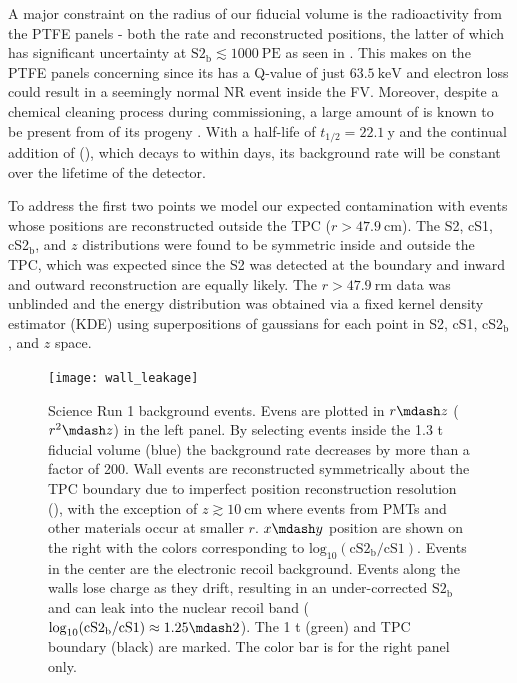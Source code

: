 A major constraint on the radius of our fiducial volume is the radioactivity from the PTFE panels - both the rate and reconstructed
positions, the latter of which has significant uncertainty at $\mathrm{S2_b} \lesssim 1000\ \mathrm{PE}$ as seen in
.  This makes  on the PTFE panels concerning since its \betadecay has
a Q-value of just $63.5\ \mathrm{keV}$ and electron loss could result in a seemingly normal NR event inside the FV.  Moreover, despite a
chemical cleaning process during commissioning, a large amount of  is known to be present from \alphadecays of its progeny
.  With a half-life of $t_{1/2} = 22.1\ \mathrm{y}$ and the continual addition of 
(), which decays to  within days, its background rate will be
constant over the lifetime of the detector.

To address the first two points we model our expected contamination with events whose positions are reconstructed outside the
TPC ($r > 47.9\ \mathrm{cm}$).  The S2, cS1, cS2$_{\mathrm{b}}$, and $z$
distributions were found to be symmetric inside and outside the TPC, which was expected since the S2 was detected at the boundary and
inward and outward reconstruction are equally likely.  The
$r > 47.9\ \mathrm{rm}$ data was unblinded and the energy distribution was obtained via a fixed kernel density estimator (KDE) using
superpositions of gaussians for each point in S2, cS1, cS2$_{\mathrm{b}}$, and $z$ space.

\begin{figure}
\centering
\texttt{[image: wall\_leakage]}
\caption{Science Run 1 background events.  Evens are plotted in $r \mdash z$ ($r^2 \mdash z$) in the left panel.  By selecting events
inside the 1.3
t fiducial volume (blue) the background rate decreases by more than a factor of 200.  Wall events are reconstructed symmetrically
about the TPC boundary due to imperfect position reconstruction resolution (), with the
exception of $z \gtrsim 10\ \mathrm{cm}$ where events from PMTs and other materials occur at smaller $r$.  $x \mdash y$ position are shown
on the right with the colors corresponding to $\mathrm{log}_{10}(\mathrm{cS2_b / cS1})$.  Events in the center are the electronic recoil
background.  Events along the walls lose charge as they drift,
resulting in an under-corrected $\mathrm{S2_b}$ and can leak into the nuclear recoil band
($\mathrm{log}_{10}(\mathrm{cS2_b / cS1}) \approx 1.25 \mdash 2$).  The 1 t (green) and TPC boundary (black) are marked.  The color bar is
for the right panel only.}
\label{fig:backgrounds_detector_materials_wall_leakage}
\end{figure}

